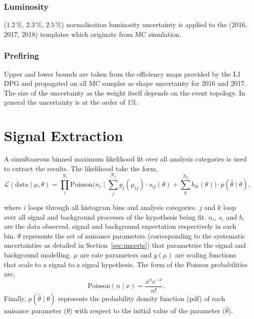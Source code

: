 \subsubsection{Luminosity}
($1.2\,\%$, $2.3\,\%$, $2.5\,\%$) normalisation luminosity uncertainty is applied to the (2016, 2017, 2018) templates which originate from MC simulation.

\subsubsection{Prefiring}
Upper and lower bounds are taken from the efficiency maps provided by the L1 DPG and propagated on all MC samples as shape uncertainty for 2016 and 2017.
The size of the uncertainty as the weight itself depends on the event topology. In general the uncertainty is at the order of 1\%.

\section{Signal Extraction}
\label{sec:sig_ext}

A simultaneous binned maximum likelihood fit over all analysis categories is used to extract the results.
The likelihood take the form,
\begin{equation}
\mathcal{L}(\text{data}\mid\mu,\theta) = \prod_{i}^{N_{i}} \text{Poisson} \Big(n_{i} \mid \sum_{j}^{N_{j}} g_{j}(\mu_{ij}) \cdot s_{ij}(\theta) + \sum_{k}^{N_{k}} b_{ik}(\theta)\Big) \cdot p(\hat{\theta} \mid \theta),
\label{eqn:likelihood}
\end{equation}

where $i$ loops through all histogram bins and analysis categories.
$j$ and $k$ loop over all signal and background processes of the hypothesis being fit.
$n_i$, $s_i$ and $b_i$ are the data observed, signal and background expectation respectively in each bin.
$\theta$ represents the set of nuisance parameters (corresponding to the systematic uncertainties as detailed in Section~\ref{sec:uncerts}) that parametrise the signal and background modelling.
$\mu$ are rate parameters and $g(\mu)$ are scaling functions that scale to a signal to a signal hypothesis.
The form of the Poisson probabilities are,
\begin{equation}
\text{Poisson} (n \mid x) = \frac{x^{n}e^{-x}}{n!}.
\end{equation}
Finally, $p(\hat{\theta} \mid \theta)$ represents the probability density function (pdf) of each nuisance parameter ($\theta$) with respect to the initial value of the parameter ($\hat{\theta}$). \\

